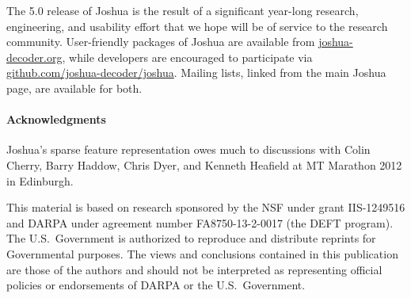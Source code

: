 \documentclass[11pt]{article}
\begin{document}
The 5.0 release of Joshua is the result of a significant year-long
research, engineering, and usability effort that we hope will be of
service to the research community. User-friendly packages of Joshua
are available from \url{joshua-decoder.org}, while developers are
encouraged to participate via
\url{github.com/joshua-decoder/joshua}. Mailing lists, linked from the
main Joshua page, are available for both.

\paragraph{Acknowledgments}

Joshua's sparse feature representation owes much to discussions with
Colin Cherry, Barry Haddow, Chris Dyer, and Kenneth Heafield at MT
Marathon 2012 in Edinburgh.

This material is based on research sponsored by the NSF under grant
IIS-1249516 and DARPA under agreement number FA8750-13-2-0017 (the
DEFT program).  The U.S.\ Government is authorized to reproduce and
distribute reprints for Governmental purposes.  The views and
conclusions contained in this publication are those of the authors and
should not be interpreted as representing official policies or
endorsements of DARPA or the U.S.\ Government.



\end{document}
